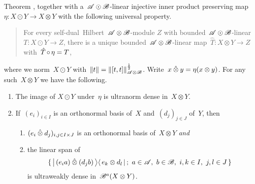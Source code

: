 \documentclass[b]{subfiles}
\begin{document}
\begin{parsec}
\begin{point}{Theorem}
    ,
    together with a~$\mathscr{A} \odot \mathscr{B}$-linear injective
    inner product preserving map~$\eta \colon X \odot Y \to X\otimes Y$
    with the following universal property.
    \begin{quote}
    For every self-dual~Hilbert~$\mathscr{A}\otimes\mathscr{B}$-module
    $Z$ with bounded~$\mathscr{A} \odot \mathscr{B}$-linear
        $T\colon X \odot Y \to Z$,
    there is a unique bounded~$\mathscr{A} \otimes \mathscr{B}$-linear
        map~$\hat{T}\colon X \otimes Y \to Z$
    with~$\hat{T} \mathop{\circ} \eta= T$,
    \end{quote}
where we norm~$X \odot Y$ with~$\|t \| = \|[t,t]\|^{\frac{1}{2}}_{\mathscr{A}\otimes \mathscr{B}}$.
Write~$x \mathbin{\hat{\otimes}} y = \eta(x\otimes y)$.
For any such~$X \otimes Y$ we have the following.
\begin{enumerate}
    \item The image of $X \odot Y$ under~$\eta$ is ultranorm dense in~$X \otimes Y$.
    \item If~$(e_i)_{i \in I}$ is an orthonormal basis of~$X$
                and~$(d_j)_{j \in J}$ of~$Y$,
                then
        \begin{enumerate}
            \item $(e_i \mathbin{\hat{\otimes}} d_j)_{i,j\in I\times J}$
                is an orthonormal basis of~$X \otimes Y$ \emph{and}
            \item
                the linear span of
                \begin{equation*}
                    \{\, \ketbra{\,(e_i a) \hotimes (d_j b) \,}{\,
                        e_{k}\otimes d_{l} \,}; \ 
                        a \in \scrA, \ 
                        b \in \scrB,\ 
                        i,k \in I,\ 
                        j,l \in J \,
                    \} 
                \end{equation*}
                is ultraweakly dense in~$\mathscr{B}^a(X \otimes Y)$.
        \end{enumerate}
                

\end{enumerate}
\end{point}
\end{parsec}
\end{document}
